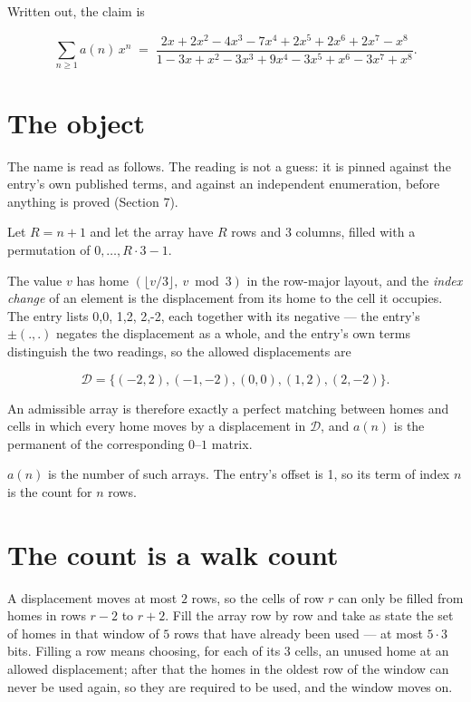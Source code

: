 \documentclass[11pt]{article}
\theoremstyle{definition}
\begin{document}
Written out, the claim is

\[\sum_{n \ge 1} a(n)\,x^n \;=\; \frac{2x + 2x^{2} - 4x^{3} - 7x^{4} + 2x^{5} + 2x^{6} + 2x^{7} - x^{8}}{1 - 3x + x^{2} - 3x^{3} + 9x^{4} - 3x^{5} + x^{6} - 3x^{7} + x^{8}}.\]

\section{The object}

The name is read as follows. The reading is not a guess: it is pinned against the entry's own published terms, and against an independent enumeration, before anything is proved (Section 7).

Let $R = n + 1$ and let the array have $R$ rows and $3$ columns, filled with a permutation of $0,\dots,R\cdot3-1$.

The value $v$ has home $(\lfloor v/3\rfloor,\ v \bmod 3)$ in the row-major layout, and the {\itshape index change} of an element is the displacement from its home to the cell it occupies. The entry lists 0,0, 1,2, 2,-2, each together with its negative --- the entry's $\pm(.,.)$ negates the displacement as a whole, and the entry's own terms distinguish the two readings, so the allowed displacements are

\[\mathcal{D} = \{(-2,2), (-1,-2), (0,0), (1,2), (2,-2)\}.\]

An admissible array is therefore exactly a perfect matching between homes and cells in which every home moves by a displacement in $\mathcal{D}$, and $a(n)$ is the permanent of the corresponding $0$--$1$ matrix.

$a(n)$ is the number of such arrays. The entry's offset is 1, so its term of index $n$ is the count for $n$ rows.

\section{The count is a walk count}

A displacement moves at most $2$ rows, so the cells of row $r$ can only be filled from homes in rows $r-2$ to $r+2$. Fill the array row by row and take as state the set of homes in that window of $5$ rows that have already been used --- at most $5\cdot3$ bits. Filling a row means choosing, for each of its $3$ cells, an unused home at an allowed displacement; after that the homes in the oldest row of the window can never be used again, so they are required to be used, and the window moves on.
\end{document}
